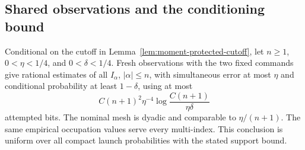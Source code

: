\subsection{Shared observations and the conditioning bound}
\begin{lemma}
\label{lem:moment-shared-quadrature}
Conditional on the cutoff in Lemma~\ref{lem:moment-protected-cutoff},
let $n\ge1$, $0<\eta<1/4$, and $0<\delta<1/4$.  Fresh observations
with the two fixed commands give rational estimates of all
$I_\alpha$, $|\alpha|\le n$, with simultaneous error at most
$\eta$ and conditional probability at least $1-\delta$, using at
most
\begin{equation}\label{eq:moment-shared-quadrature-cost}
 C(n+1)^2\eta^{-4}
                   \log\frac{C(n+1)}{\eta\delta}
\end{equation}
attempted bits.  The nominal mesh is dyadic and comparable to
$\eta/(n+1)$.  The same empirical occupation values serve every
multi-index.  This conclusion is uniform over all compact launch
probabilities with the stated support bound.
\end{lemma}
